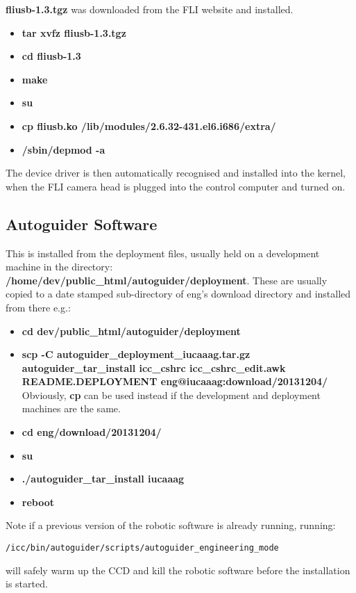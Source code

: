 \documentclass[10pt,a4paper]{article}
\begin{document}
{\bf fliusb-1.3.tgz} was downloaded from the FLI website \cite{bib:flidevicedriver} and installed.

\begin{itemize}
\item {\bf tar xvfz fliusb-1.3.tgz}
\item {\bf cd fliusb-1.3}
\item {\bf make}
\item {\bf su}
\item {\bf cp fliusb.ko /lib/modules/2.6.32-431.el6.i686/extra/}
\item {\bf /sbin/depmod -a}
\end{itemize}

The device driver is then automatically recognised and installed into the kernel, when the FLI camera head is plugged into the control computer and turned on.

\subsection{Autoguider Software}

This is installed from the deployment files, usually held on a development machine in the directory:
{\bf /home/dev/public\_html/autoguider/deployment}. These are usually copied to a date stamped sub-directory of eng's download directory and installed from there e.g.:

\begin{itemize}
\item {\bf cd \mytilde dev/public\_html/autoguider/deployment}
\item {\bf scp -C autoguider\_deployment\_iucaaag.tar.gz autoguider\_tar\_install icc\_cshrc icc\_cshrc\_edit.awk README.DEPLOYMENT eng@iucaaag:download/20131204/} Obviously, {\bf cp} can be used instead if the development and deployment machines are the same.
\item {\bf cd \mytilde eng/download/20131204/}
\item {\bf su}
\item {\bf ./autoguider\_tar\_install iucaaag}
\item {\bf reboot}
\end{itemize}

Note if a previous version of the robotic software is already running, running:
\begin{verbatim}
/icc/bin/autoguider/scripts/autoguider_engineering_mode
\end{verbatim}
will safely warm up the CCD and kill the robotic software before the installation is started.
\end{document}
